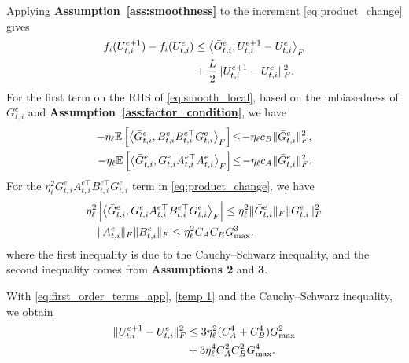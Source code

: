 \documentclass[lettersize,journal]{IEEEtran}
\begin{document}
	Applying \textbf{Assumption~\ref{ass:smoothness}} to the increment \eqref{eq:product_change} gives
	\begin{align}
		f_i(U_{t,i}^{e+1})-f_i(U_{t,i}^{e})
		&\le
		\left\langle
		\bar{G}_{t,i}^{e},
		U_{t,i}^{e+1}-U_{t,i}^{e}
		\right\rangle_F
		\notag\\
		&+
		\frac{L}{2}
		\|U_{t,i}^{e+1}-U_{t,i}^{e}\|_F^2.
		\label{eq:smooth_local}
	\end{align}
	For the first term on the RHS of \eqref{eq:smooth_local},
	based on the unbiasedness of
	$G_{t,i}^{e}$ and \textbf{Assumption~\ref{ass:factor_condition}}, we have
	\begin{align}
		-\eta_{\ell}
		\mathbb{E}
		\left[
		\left\langle
		\bar{G}_{t,i}^{e},
		B_{t,i}^{e}B_{t,i}^{e\top}G_{t,i}^{e}
		\right\rangle_F
		\right]
		\!\le\!
		-\eta_{\ell}c_B
		\|\bar{G}_{t,i}^{e}\|_F^2,
		\notag\\
		-\eta_{\ell}
		\mathbb{E}
		\left[
		\left\langle
		\bar{G}_{t,i}^{e},
		G_{t,i}^{e}A_{t,i}^{e\top}A_{t,i}^{e}
		\right\rangle_F
		\right]
		\!\le\!
		-\eta_{\ell}c_A
		\|\bar{G}_{t,i}^{e}\|_F^2.
		\label{eq:first_order_terms_app}
	\end{align}
	For the $\eta_{\ell}^{2}
	G_{t,i}^{e}A_{t,i}^{e\top}
	B_{t,i}^{e\top}G_{t,i}^{e}$ term in \eqref{eq:product_change}, we have
	\begin{align} \label{temp 1}
		&\eta_{\ell}^{2}
		\left|
		\left\langle
		\bar{G}_{t,i}^{e},
		G_{t,i}^{e}A_{t,i}^{e\top}
		B_{t,i}^{e\top}G_{t,i}^{e}
		\right\rangle_F
		\right|
		\le
		\eta_{\ell}^{2}
		\|\bar{G}_{t,i}^{e}\|_F
		\|G_{t,i}^{e}\|_F^2
		\notag\\
		&\quad
		\|A_{t,i}^{e}\|_F
		\|B_{t,i}^{e}\|_F 
		\le
		\eta_{\ell}^{2}C_AC_BG_{\max}^{3}.
	\end{align}
	where the first inequality is due to the Cauchy--Schwarz inequality, and the second inequality comes from \textbf{Assumptions 2} and \textbf{3}.
	
	With \eqref{eq:first_order_terms_app}, \eqref{temp 1} and the Cauchy--Schwarz inequality, we obtain
	\begin{align}
		\|U_{t,i}^{e+1}-U_{t,i}^{e}\|_F^2
		&\le
		3\eta_{\ell}^{2}
		(C_A^{4}+C_B^{4})G_{\max}^{2}
		\notag\\
		&+3\eta_{\ell}^{4}
		C_A^{2}C_B^{2}G_{\max}^{4}.
		\label{eq:higher_order_bounds_app}
	\end{align}
	
\end{document}
